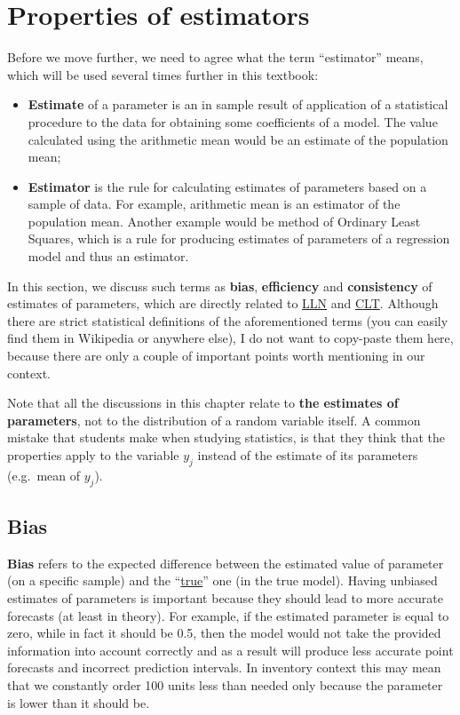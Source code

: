\documentclass[
]{book}
\providecommand{\tightlist}{%
  \setlength{\itemsep}{0pt}\setlength{\parskip}{0pt}}
\theoremstyle{definition}
\theoremstyle{definition}
\theoremstyle{definition}
\theoremstyle{definition}
\theoremstyle{remark}
\begin{document}
\section{Properties of estimators}\label{estimatesProperties}

Before we move further, we need to agree what the term ``estimator'' means, which will be used several times further in this textbook:

\begin{itemize}
\tightlist
\item
  \textbf{Estimate} of a parameter is an in sample result of application of a statistical procedure to the data for obtaining some coefficients of a model. The value calculated using the arithmetic mean would be an estimate of the population mean;
\item
  \textbf{Estimator} is the rule for calculating estimates of parameters based on a sample of data. For example, arithmetic mean is an estimator of the population mean. Another example would be method of Ordinary Least Squares, which is a rule for producing estimates of parameters of a regression model and thus an estimator.
\end{itemize}

In this section, we discuss such terms as \textbf{bias}, \textbf{efficiency} and \textbf{consistency} of estimates of parameters, which are directly related to \hyperref[LLN]{LLN} and \hyperref[CLT]{CLT}. Although there are strict statistical definitions of the aforementioned terms (you can easily find them in Wikipedia or anywhere else), I do not want to copy-paste them here, because there are only a couple of important points worth mentioning in our context.

Note that all the discussions in this chapter relate to \textbf{the estimates of parameters}, not to the distribution of a random variable itself. A common mistake that students make when studying statistics, is that they think that the properties apply to the variable \(y_j\) instead of the estimate of its parameters (e.g.~mean of \(y_j\)).

\subsection{Bias}\label{estimatesPropertiesBias}

\textbf{Bias} refers to the expected difference between the estimated value of parameter (on a specific sample) and the ``\hyperref[intro]{true}'' one (in the true model). Having unbiased estimates of parameters is important because they should lead to more accurate forecasts (at least in theory). For example, if the estimated parameter is equal to zero, while in fact it should be 0.5, then the model would not take the provided information into account correctly and as a result will produce less accurate point forecasts and incorrect prediction intervals. In inventory context this may mean that we constantly order 100 units less than needed only because the parameter is lower than it should be.
\end{document}
